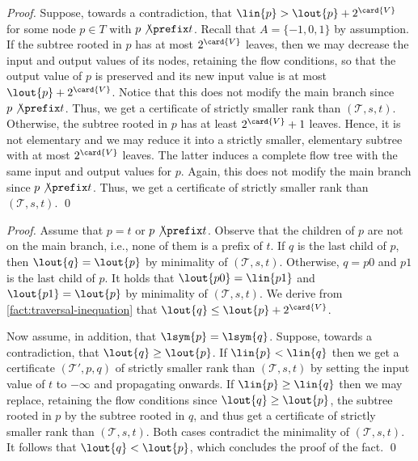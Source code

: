 \FactTraversalInequation*
\begin{proof}
  Suppose, towards a contradiction,
  that $\lin{p} > \lout{p} + 2^{\card{V}}$ for some node $p \in T$
  with $p \not\prefix t$.
  Recall that $A = \{-1,0,1\}$ by assumption.
  If the subtree rooted in $p$ has at most $2^{\card{V}}$ leaves,
  then we may decrease the input and output values of its nodes,
  retaining the flow conditions,
  so that the output value of $p$ is preserved and its new input value
  is at most $\lout{p} + 2^{\card{V}}$.
  Notice that this does not modify the main branch since $p \not\prefix t$.
  Thus,
  we get a certificate of strictly smaller rank than $(\mathcal{T}, s, t)$.
  Otherwise,
  the subtree rooted in $p$ has at least $2^{\card{V}} + 1$ leaves.
  Hence,
  it is not elementary
  and we may reduce it into a strictly smaller,
  elementary subtree with at most $2^{\card{V}}$ leaves.
  The latter induces a complete flow tree
  with the same input and output values for $p$.
  Again,
  this does not modify the main branch since $p \not\prefix t$.
  Thus,
  we get a certificate of strictly smaller rank than $(\mathcal{T}, s, t)$.
  \qed
\end{proof}

\FactDescentOutsideMB*
\begin{proof}
  Assume that $p = t$ or $p \not\prefix t$.
  Observe that the children of $p$ are not on the main branch,
  i.e.,
  none of them is a prefix of $t$.
  If $q$ is the last child of $p$,
  then $\lout{q} = \lout{p}$ by minimality of $(\mathcal{T}, s, t)$.
  Otherwise,
  $q = p0$ and $p1$ is the last child of $p$.
  It holds that $\lout{p0} = \lin{p1}$ and $\lout{p1} = \lout{p}$
  by minimality of $(\mathcal{T}, s, t)$.
  We derive from \cref{fact:traversal-inequation} that
  $\lout{q} \leq \lout{p} + 2^{\card{V}}$.

  Now assume, in addition, that $\lsym{p} = \lsym{q}$.
  Suppose, towards a contradiction, that $\lout{q} \geq \lout{p}$.
  If $\lin{p} < \lin{q}$ then we get a certificate $(\mathcal{T}', p, q)$
  of strictly smaller rank than $(\mathcal{T}, s, t)$ by setting the input value
  of $t$ to $-\infty$ and propagating onwards.
  If $\lin{p} \geq \lin{q}$ then we may replace,
  retaining the flow conditions since $\lout{q} \geq \lout{p}$,
  the subtree rooted in $p$ by the subtree rooted in $q$,
  and thus get a certificate
  of strictly smaller rank than $(\mathcal{T}, s, t)$.
  Both cases contradict the minimality of $(\mathcal{T}, s, t)$.
  It follows that $\lout{q} < \lout{p}$,
  which concludes the proof of the fact.
  \qed
\end{proof}

